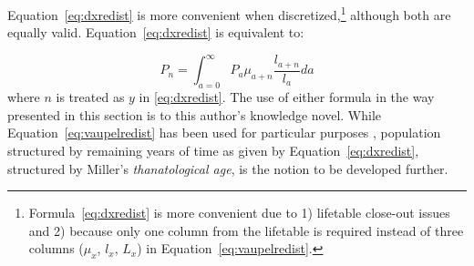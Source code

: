 Equation~\eqref{eq:dxredist} is more convenient when 
discretized,\footnote{Formula~\eqref{eq:dxredist} is more convenient due to 1)
lifetable close-out issues and 2) because only one column from the lifetable is required instead 
of three columns ($\mu_x$, $l_x$, $L_x$) in
Equation~\eqref{eq:vaupelredist}. } although both are equally valid.
Equation~\ref{eq:dxredist} is equivalent to:

\begin{equation}
P_n = \int _{a=0} ^\infty P_a \mu_{a+n} \frac{l_{a+n}}{l_a} da
\end{equation}
where $n$ is treated as $y$ in \ref{eq:dxredist}.
The use of either formula in the way presented in this section is to this
author's knowledge novel. While Equation~\eqref{eq:vaupelredist} has
been used for particular purposes \citep{miller2001increasing}, population
structured by remaining years of time as given by Equation~\eqref{eq:dxredist}, structured
by Miller's \textit{thanatological age}, is the notion
to be developed further.

